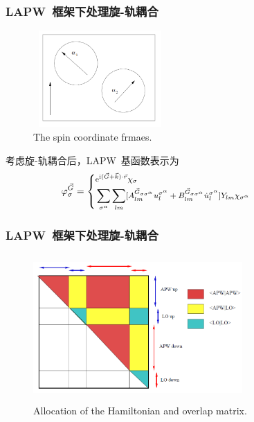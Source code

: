 \frame
{
	\frametitle{\textrm{LAPW~}框架下处理旋-轨耦合}
\begin{figure}[h!]
\centering
\vspace*{-0.10in}
\includegraphics[height=1.45in,width=2.01in,viewport=0 10 430 330,clip]{Figures/WIENNCM_Sphere.png}
\caption{\small \textrm{The spin coordinate frmaes.}}%
\label{WIENNCM_sphere}
\end{figure}
考虑旋-轨耦合后，\textrm{LAPW~}基函数表示为
\begin{displaymath}
	\footnotesize\hskip -50pt \varphi^{\vec G}_{\sigma}=\left\{
  \begin{aligned}
	  &\mathrm{e}^{\mathrm{i}(\vec G+\vec k)\cdot\vec r}\chi_{\sigma}\\
	  &\sum_{\sigma^{\alpha}}\sum_{lm}[A^{\vec G_{\sigma\sigma^{\alpha}}}_{lm}u_l^{\sigma^{\alpha}}+B^{\vec G_{\sigma\sigma^{\alpha}}}_{lm}\dot u_l^{\sigma^{\alpha}}]Y_{lm}\chi_{\sigma^{\alpha}}
  \end{aligned}
\right.
\end{displaymath}
}

\frame
{
	\frametitle{\textrm{LAPW~}框架下处理旋-轨耦合}
\begin{figure}[h!]
\centering
\vspace*{-0.10in}
\includegraphics[height=2.19in,width=3.15in,viewport=0 0 650 430,clip]{Figures/WIENNCM_Ham.png}
\caption{\small \textrm{Allocation of the Hamiltonian and overlap matrix.}}%
\label{WIENNCM_Ham}
\end{figure}
}
